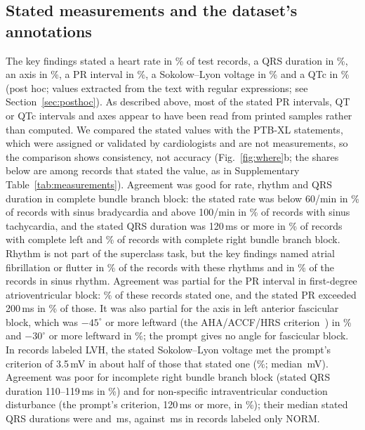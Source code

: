 \subsection{Stated measurements and the dataset's annotations}
The key findings stated a heart rate in \PHStatedCodeHr\% of test records, a QRS duration in
\PHStatedCodeQrs\%, an axis in \PHStatedCodeAxis\%, a PR interval in \PHStatedCodePr\%, a Sokolow--Lyon voltage in
\PHStatedCodeSokolow\% and a QTc in \PHStatedCodeQtc\% (post hoc; values extracted from the text with regular
expressions; see Section~\ref{sec:posthoc}). As described above, most of the stated PR intervals, QT or QTc intervals and axes appear to
have been read from printed samples rather than computed. We compared the stated values with the PTB-XL statements,
which were assigned or validated by cardiologists and are not measurements, so the comparison shows consistency, not accuracy
(Fig.~\ref{fig:where}b; the shares below are among records that stated the value, as in Supplementary
Table~\ref{tab:measurements}). Agreement was good for rate, rhythm and QRS duration in complete bundle branch block:
the stated rate was below 60/min in \PHMeasSBRADCodeCrit\% of records with sinus bradycardia and above 100/min in
\PHMeasSTACHCodeCrit\% of records with sinus tachycardia, and the stated QRS duration was 120\,ms or more in
\PHMeasCLBBBCodeCrit\% of records with complete left and \PHMeasCRBBBCodeCrit\% of records with complete right bundle
branch block. Rhythm is not part of the superclass task, but the key findings named atrial fibrillation or flutter in
\PHMeasAFCodeCrit\% of the \PHMeasAFN{} records with these rhythms and in \PHMeasSRAFCodeCrit\% of the \PHMeasSRAFN{}
records in sinus rhythm. Agreement was partial for the PR interval in first-degree atrioventricular block:
\PHMeasOneAVBCodeStated\% of these records stated one, and the stated PR exceeded 200\,ms in \PHMeasOneAVBCodeCrit\%
of those. It was also partial for the axis in left anterior fascicular block, which was $-45^\circ$ or more leftward
(the AHA/ACCF/HRS criterion~\citep{surawicz2009recommendations}) in \PHMeasLAFBFortyFiveCodeCrit\% and $-30^\circ$ or
more leftward in \PHMeasLAFBCodeCrit\%; the prompt gives no angle for fascicular block. In records labeled LVH, the
stated Sokolow--Lyon voltage met the prompt's criterion of 3.5\,mV in about half of those that stated one
(\PHMeasLVHCodeCrit\%; median \PHMeasLVHCodeMedian\,mV). Agreement was poor for incomplete right bundle branch block
(stated QRS duration 110--119\,ms in \PHMeasIRBBBCodeCrit\%) and for non-specific intraventricular conduction
disturbance (the prompt's criterion, 120\,ms or more, in \PHMeasIVCDCodeCrit\%); their median stated QRS durations
were \PHMeasIRBBBCodeMedian{} and \PHMeasIVCDCodeMedian\,ms, against \PHMeasNormQRSCodeMedian\,ms in records labeled
only NORM.

